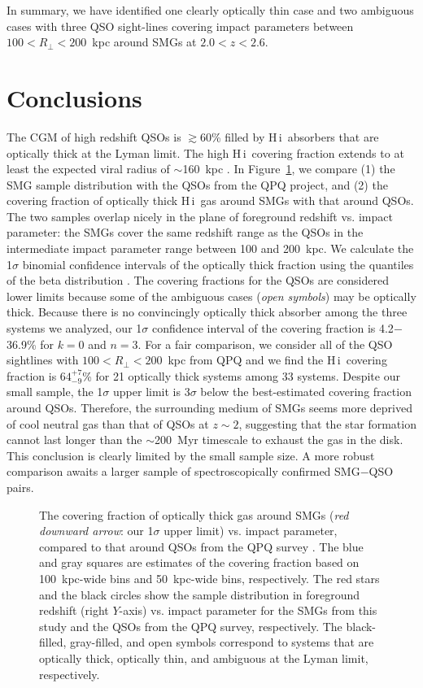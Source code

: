 \documentclass[iop,revtex4,twocolumn,apj,numberedappendix,appendixfloats]{emulateapj}
\newcommand{\HI}{H\,{\sc i}}
\newcommand{\sqps}{SMG$-$QSO pairs}
\begin{document}
In summary, we have identified one clearly optically thin case and two ambiguous cases with three QSO sight-lines covering impact parameters between $100 < R_\bot < 200$~kpc around SMGs at $2.0 < z < 2.6$. 

\section{Conclusions} \label{sec:discuss}

The CGM of high redshift QSOs is $\gtrsim$60\% filled by \HI\ absorbers that are optically thick at the Lyman limit. The high \HI\ covering fraction extends to at least the expected viral radius of $\sim$160~kpc \citep[][]{Hennawi06,Prochaska13,Prochaska13a}. In Figure~\ref{fig:covfrac}, we compare (1) the SMG sample distribution with the QSOs from the QPQ project, and (2) the covering fraction of optically thick \HI\ gas around SMGs with that around QSOs. The two samples overlap nicely in the plane of foreground redshift vs. impact parameter: the SMGs cover the same redshift range as the QSOs in the intermediate impact parameter range between 100 and 200~kpc. We calculate the 1$\sigma$ binomial confidence intervals of the optically thick fraction using the quantiles of the beta distribution \citep{Cameron11}. The covering fractions for the QSOs are considered lower limits because some of the ambiguous cases ({\it open symbols}) may be optically thick. Because there is no convincingly optically thick absorber among the three systems we analyzed, our 1$\sigma$ confidence interval of the covering fraction is 4.2$-$36.9\% for $k = 0$ and $n = 3$. For a fair comparison, we consider all of the QSO sightlines with $100 < R_\bot < 200$~kpc from QPQ and we find the \HI\ covering fraction is $64^{+7}_{-9}$\% for 21 optically thick systems among 33 systems. Despite our small sample, the 1$\sigma$ upper limit is 3$\sigma$ below the best-estimated covering fraction around QSOs. Therefore, the surrounding medium of SMGs seems more deprived of cool neutral gas than that of QSOs at $z \sim 2$, suggesting that the star formation cannot last longer than the $\sim$200~Myr timescale to exhaust the gas in the disk. This conclusion is clearly limited by the small sample size. A more robust comparison awaits a larger sample of spectroscopically confirmed \sqps.

\begin{figure}[!tb]
\caption{The covering fraction of optically thick gas around SMGs ({\it red downward arrow}: our 1$\sigma$ upper limit) vs. impact parameter, compared to that around QSOs from the QPQ survey \citep[{\it blue/gray squares} with error bars;][]{Prochaska13}. The blue and gray squares are estimates of the covering fraction based on 100~kpc-wide bins and 50~kpc-wide bins, respectively. The red stars and the black circles show the sample distribution in foreground redshift (right $Y$-axis) vs. impact parameter for the SMGs from this study and the QSOs from the QPQ survey, respectively. The black-filled, gray-filled, and open symbols correspond to systems that are optically thick, optically thin, and ambiguous at the Lyman limit, respectively.   
\label{fig:covfrac}} 
\end{figure}
\end{document}
